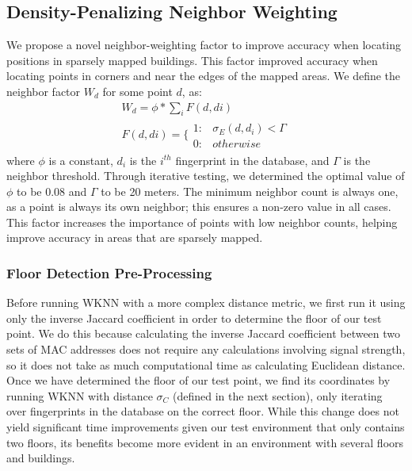 \documentclass[conference]{IEEEtran}
\begin{document}
\subsection{Density-Penalizing Neighbor Weighting}
\indent We propose a novel neighbor-weighting factor to improve accuracy when locating positions in sparsely mapped buildings. This factor improved accuracy when locating points in corners and near the edges of the mapped areas. We define the neighbor factor $W_d$ for some point $d$, as:
\begin{equation}
\label{density}
\begin{split}
W_d=\phi*\sum\limits_{i}F(d,di)\\
F(d,di)=\{\begin{array}{lr}
       1: &  \sigma_E(d, d_i) < \Gamma \\
       0: &  otherwise
\end{array}
\end{split}
\end{equation}
where $\phi$ is a constant, $d_i$ is the $i^{th}$ fingerprint in the database, and $\Gamma$ is the neighbor threshold. Through iterative testing, we determined the optimal value of $\phi$ to be 0.08 and $\Gamma$ to be 20 meters. The minimum neighbor count is always one, as a point is always its own neighbor; this ensures a non-zero value in all cases. This factor increases the importance of points with low neighbor counts, helping improve accuracy in areas that are sparsely mapped. 

\subsubsection*{Floor Detection Pre-Processing}
\indent Before running WKNN with a more complex distance metric, we first run it using only the inverse Jaccard coefficient in order to determine the floor of our test point. We do this because calculating the inverse Jaccard coefficient between two sets of MAC addresses does not require any calculations involving signal strength, so it does not take as much computational time as calculating Euclidean distance. Once we have determined the floor of our test point, we find its coordinates by running WKNN with distance $\sigma_C$ (defined in the next section), only iterating over fingerprints in the database on the correct floor. While this change does not yield significant time improvements given our test environment that only contains two floors, its benefits become more evident in an environment with several floors and buildings.
\end{document}
